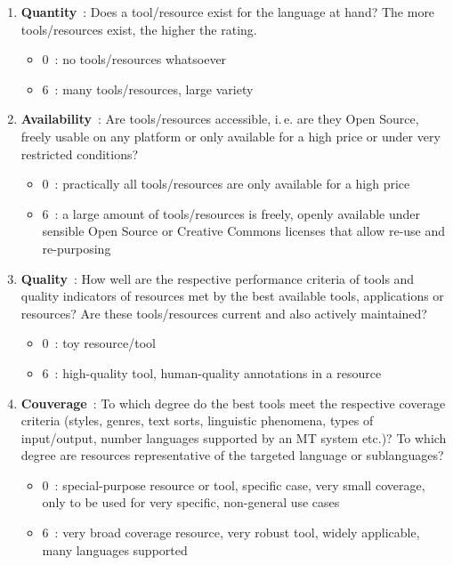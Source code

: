 \begin{multicols}{2}
\begin{enumerate}
\item {\bf Quantity}~: Does a tool/resource exist for the language at hand? The more tools/resources exist, the higher the rating.
      \begin{itemize}
      \item 0~: no tools/resources whatsoever
      \item 6~: many tools/resources, large variety
      \end{itemize}

\item {\bf Availability}~: Are tools/resources accessible, i.\,e. are they Open Source, freely usable on any platform or only available for a high price or under very restricted conditions?
      \begin{itemize}
      \item 0~: practically all tools/resources are only available for a high price
      \item 6~: a large amount of tools/resources is freely, openly available under sensible Open Source or Creative Commons licenses that allow re-use and re-purposing
      \end{itemize}

\item {\bf Quality}~: How well are the respective performance criteria of tools and quality indicators of resources met by the best available tools, applications or resources? Are these tools/resources current and also actively maintained?
      \begin{itemize}
      \item 0~: toy resource/tool
      \item 6~: high-quality tool, human-quality annotations in a resource
      \end{itemize}

\item {\bf Couverage}~: To which degree do the best tools meet the respective coverage criteria (styles, genres, text sorts, linguistic phenomena, types of input/output, number languages supported by an MT system etc.)? To which degree are resources representative of the targeted language or sublanguages?
      \begin{itemize}
      \item 0~: special-purpose resource or tool, specific case, very small coverage, only to be used for very specific, non-general use cases
      \item 6~: very broad coverage resource, very robust tool, widely applicable, many languages supported
      \end{itemize}


\end{enumerate}
\end{multicols}
